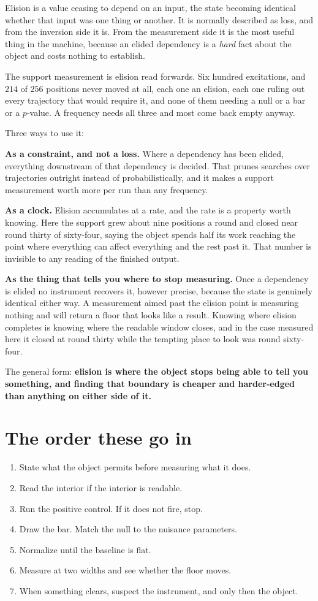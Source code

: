 Elision is a value ceasing to depend on an input, the state becoming identical whether that input was one thing or another. It is normally described as loss, and from the inversion side it is. From the measurement side it is the most useful thing in the machine, because an elided dependency is a \emph{hard} fact about the object and costs nothing to establish.

The support measurement is elision read forwards. Six hundred excitations, and \(214\) of \(256\) positions never moved at all, each one an elision, each one ruling out every trajectory that would require it, and none of them needing a null or a bar or a \(p\)-value. A frequency needs all three and most come back empty anyway.

Three ways to use it:

\textbf{As a constraint, and not a loss.} Where a dependency has been elided, everything downstream of that dependency is decided. That prunes searches over trajectories outright instead of probabilistically, and it makes a support measurement worth more per run than any frequency.

\textbf{As a clock.} Elision accumulates at a rate, and the rate is a property worth knowing. Here the support grew about nine positions a round and closed near round thirty of sixty-four, saying the object spends half its work reaching the point where everything can affect everything and the rest past it. That number is invisible to any reading of the finished output.

\textbf{As the thing that tells you where to stop measuring.} Once a dependency is elided no instrument recovers it, however precise, because the state is genuinely identical either way. A measurement aimed past the elision point is measuring nothing and will return a floor that looks like a result. Knowing where elision completes is knowing where the readable window closes, and in the case measured here it closed at round thirty while the tempting place to look was round sixty-four.

The general form: \textbf{elision is where the object stops being able to tell you something, and finding that boundary is cheaper and harder-edged than anything on either side of it.}

\section{The order these go in}

\begin{enumerate}
  \item State what the object permits before measuring what it does.
  \item Read the interior if the interior is readable.
  \item Run the positive control. If it does not fire, stop.
  \item Draw the bar. Match the null to the nuisance parameters.
  \item Normalize until the baseline is flat.
  \item Measure at two widths and see whether the floor moves.
  \item When something clears, suspect the instrument, and only then the object.
\end{enumerate}
